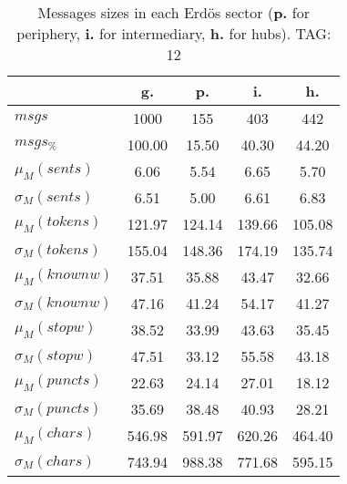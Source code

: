 \begin{table}[h!]
\begin{center}
\begin{tabular}{| l | c | c | c | c |}\hline
 & g. & p. & i. & h. \\\hline
$msgs$ & 1000  & 155  & 403  & 442 \\\hline
$msgs_{\%}$ & 100.00  & 15.50  & 40.30  & 44.20 \\\hline
$\mu_M(sents)$ & 6.06  & 5.54  & 6.65  & 5.70 \\\hline
$\sigma_M(sents)$ & 6.51  & 5.00  & 6.61  & 6.83 \\\hline
$\mu_M(tokens)$ & 121.97  & 124.14  & 139.66  & 105.08 \\\hline
$\sigma_M(tokens)$ & 155.04  & 148.36  & 174.19  & 135.74 \\\hline
$\mu_M(knownw)$ & 37.51  & 35.88  & 43.47  & 32.66 \\\hline
$\sigma_M(knownw)$ & 47.16  & 41.24  & 54.17  & 41.27 \\\hline
$\mu_M(stopw)$ & 38.52  & 33.99  & 43.63  & 35.45 \\\hline
$\sigma_M(stopw)$ & 47.51  & 33.12  & 55.58  & 43.18 \\\hline
$\mu_M(puncts)$ & 22.63  & 24.14  & 27.01  & 18.12 \\\hline
$\sigma_M(puncts)$ & 35.69  & 38.48  & 40.93  & 28.21 \\\hline
$\mu_M(chars)$ & 546.98  & 591.97  & 620.26  & 464.40 \\\hline
$\sigma_M(chars)$ & 743.94  & 988.38  & 771.68  & 595.15 \\\hline
\end{tabular}
\caption{Messages sizes in each Erd\"os sector ({{\bf p.}} for periphery, {{\bf i.}} for intermediary, {{\bf h.}} for hubs). TAG: 12}
\end{center}
\end{table}